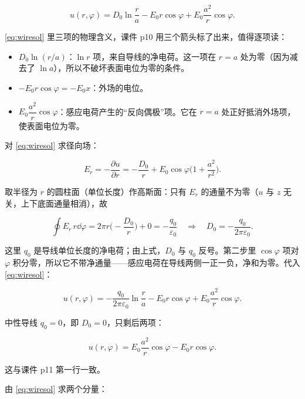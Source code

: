 \begin{equation}
u(r,\varphi)=D_0\ln\frac{r}{a}-E_0r\cos\varphi+E_0\frac{a^2}{r}\cos\varphi .
\label{eq:wiresol}
\end{equation}

\eqref{eq:wiresol} 里三项的物理含义，课件 p10 用三个箭头标了出来，值得逐项读：

\begin{itemize}
  \item $D_0\ln(r/a)$：$\ln r$ 项，来自导线的净电荷。这一项在 $r=a$ 处为零（因为减去了 $\ln a$），所以不破坏表面电位为零的条件。
  \item $-E_0r\cos\varphi=-E_0x$：外场的电位。
  \item $E_0\dfrac{a^2}{r}\cos\varphi$：感应电荷产生的“反向偶极”项。它在 $r=a$ 处正好抵消外场项，使表面电位为零。
\end{itemize}


对 \eqref{eq:wiresol} 求径向场：

\[
E_r=-\frac{\partial u}{\partial r}=-\frac{D_0}{r}+E_0\cos\varphi\Big(1+\frac{a^2}{r^2}\Big).
\]

取半径为 $r$ 的圆柱面（单位长度）作高斯面：只有 $E_r$ 的通量不为零（$u$ 与 $z$ 无关，上下底面通量相消），故

\[
\oint E_r\,r\dd\varphi=2\pi r\Big(-\frac{D_0}{r}\Big)+0=-\frac{q_0}{\varepsilon_0}
\quad\Longrightarrow\quad
D_0=-\frac{q_0}{2\pi\varepsilon_0}.
\]

这里 $q_0$ 是导线单位长度的净电荷；由上式，$D_0$ 与 $q_0$ 反号。第二步里 $\cos\varphi$ 项对 $\varphi$ 积分零，所以它不带净通量——感应电荷在导线两侧一正一负，净和为零。代入 \eqref{eq:wiresol}：

\begin{equation}
u(r,\varphi)=-\frac{q_0}{2\pi\varepsilon_0}\ln\frac{r}{a}-E_0r\cos\varphi+E_0\frac{a^2}{r}\cos\varphi .
\label{eq:wireq}
\end{equation}

中性导线 $q_0=0$，即 $D_0=0$，只剩后两项：

\begin{equation}
u(r,\varphi)=E_0\frac{a^2}{r}\cos\varphi-E_0r\cos\varphi .
\label{eq:wireneutral}
\end{equation}

这与课件 p11 第一行一致。


由 \eqref{eq:wiresol} 求两个分量：

